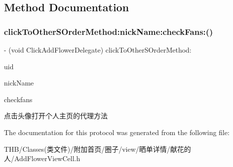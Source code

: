 \subsection{Method Documentation}
\mbox{\label{protocol_click_add_flower_delegate_01-p_a7fdcbbeb6b194284443b1771b8c939d6}} 
\subsubsection{\texorpdfstring{click\+To\+Other\+S\+Order\+Method\+:nick\+Name\+:check\+Fans\+:()}{clickToOtherSOrderMethod:nickName:checkFans:()}}
{\footnotesize\ttfamily -\/ (void Click\+Add\+Flower\+Delegate) click\+To\+Other\+S\+Order\+Method\+: \begin{DoxyParamCaption}\item[{(N\+S\+String $\ast$)}]{uid }\item[{nickName:(N\+S\+String $\ast$)}]{nick\+Name }\item[{checkFans:(N\+S\+Integer)}]{checkfans }\end{DoxyParamCaption}\hspace{0.3cm}{\ttfamily [optional]}}

点击头像打开个人主页的代理方法 

The documentation for this protocol was generated from the following file\+:\begin{DoxyCompactItemize}
\item 
T\+H\+B/\+Classes(类文件)/附加首页/圈子/view/晒单详情/献花的人/Add\+Flower\+View\+Cell.\+h\end{DoxyCompactItemize}
